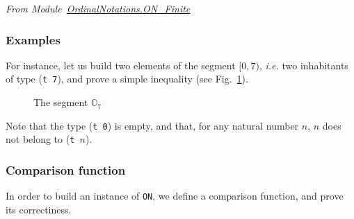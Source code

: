 \vspace{4pt}
\noindent\emph{From Module~\href{../theories/html/hydras.OrdinalNotations.ON_Finite.html}{OrdinalNotations.ON\_Finite}}

\label{def: Finite-ord-type}



\subsubsection{Examples}

For instance, let us build two elements of the segment $[0, 7)$, \emph{i.e.} two
inhabitants of   type (\texttt{t 7}), and prove a simple  inequality (see Fig.~\ref{fig:O7}).

\begin{figure}[h]
\centering
{}

\caption{The segment $\mathbb{O}_7$\label{fig:O7}}
\end{figure}
  






Note that the type (\texttt{t 0}) is empty, and that, for any natural number
 $n$, $n$ does not belong to (\texttt{t $n$}).


\subsubsection{Comparison function}

In order to build an instance of \texttt{ON}, we define a comparison function,  and prove its correctiness.

\vspace{4pt}

